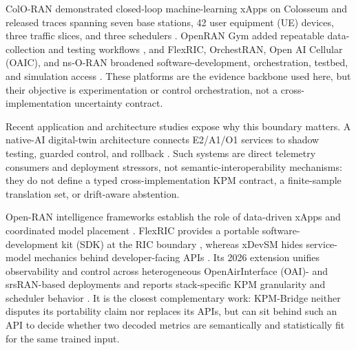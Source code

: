 \documentclass[10pt,journal,twoside]{IEEEtran}
\begin{document}
ColO-RAN demonstrated closed-loop machine-learning xApps on Colosseum and released traces spanning seven base stations, 42 user equipment (UE) devices, three traffic slices, and three schedulers \cite{polese2023coloran}. OpenRAN Gym added repeatable data-collection and testing workflows \cite{bonati2022openrangym,bonati2023openrangym}, and FlexRIC, OrchestRAN, Open AI Cellular (OAIC), and ns-O-RAN broadened software-development, orchestration, testbed, and simulation access \cite{schmidt2021flexric,doro2022orchestran,upadhyaya2023oaic,lacava2023nsoran}. These platforms are the evidence backbone used here, but their objective is experimentation or control orchestration, not a cross-implementation uncertainty contract.

Recent application and architecture studies expose why this boundary matters. A native-AI digital-twin architecture connects E2/A1/O1 services to shadow testing, guarded control, and rollback \cite{alkarawi2026nativeai}. Such systems are direct telemetry consumers and deployment stressors, not semantic-interoperability mechanisms: they do not define a typed cross-implementation KPM contract, a finite-sample translation set, or drift-aware abstention.

Open-RAN intelligence frameworks establish the role of data-driven xApps and coordinated model placement \cite{bonati2021intelligence,niknam2022intelligent,doro2022orchestran}. FlexRIC provides a portable software-development kit (SDK) at the RIC boundary \cite{schmidt2021flexric}, whereas xDevSM hides service-model mechanics behind developer-facing APIs \cite{feraudo2024xdevsm}. Its 2026 extension unifies observability and control across heterogeneous OpenAirInterface (OAI)- and srsRAN-based deployments and reports stack-specific KPM granularity and scheduler behavior \cite{feraudo2026xdevsm}. It is the closest complementary work: KPM-Bridge neither disputes its portability claim nor replaces its APIs, but can sit behind such an API to decide whether two decoded metrics are semantically and statistically fit for the same trained input.
\end{document}
